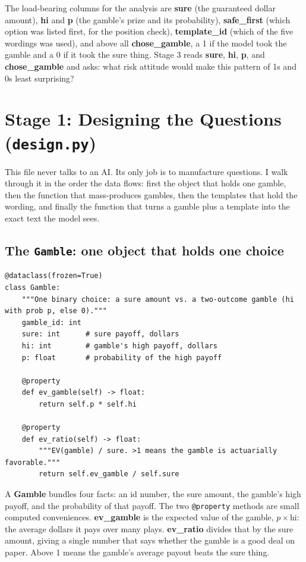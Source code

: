 \documentclass[11pt]{article}
\newcommand{\file}[1]{\textbf{\ttfamily #1}}
\begin{document}
The load-bearing columns for the analysis are \file{sure} (the guaranteed dollar amount), \file{hi}
and \file{p} (the gamble's prize and its probability), \file{safe\_first} (which option was listed
first, for the position check), \file{template\_id} (which of the five wordings was used), and above
all \file{chose\_gamble}, a 1 if the model took the gamble and a 0 if it took the sure thing. Stage 3
reads \file{sure}, \file{hi}, \file{p}, and \file{chose\_gamble} and asks: what risk attitude would
make this pattern of 1s and 0s least surprising?

\section{Stage 1: Designing the Questions (\texttt{design.py})}

This file never talks to an AI. Its only job is to manufacture questions. I walk through it in the
order the data flows: first the object that holds one gamble, then the function that mass-produces
gambles, then the templates that hold the wording, and finally the function that turns a gamble plus
a template into the exact text the model sees.

\subsection{The \texttt{Gamble}: one object that holds one choice}

\begin{lstlisting}[style=py,firstnumber=23]
@dataclass(frozen=True)
class Gamble:
    """One binary choice: a sure amount vs. a two-outcome gamble (hi with prob p, else 0)."""
    gamble_id: int
    sure: int      # sure payoff, dollars
    hi: int        # gamble's high payoff, dollars
    p: float       # probability of the high payoff

    @property
    def ev_gamble(self) -> float:
        return self.p * self.hi

    @property
    def ev_ratio(self) -> float:
        """EV(gamble) / sure. >1 means the gamble is actuarially favorable."""
        return self.ev_gamble / self.sure
\end{lstlisting}

A \file{Gamble} bundles four facts: an id number, the sure amount, the gamble's high payoff, and the
probability of that payoff. The two \verb|@property| methods are small computed conveniences.
\file{ev\_gamble} is the expected value of the gamble, $p \times \text{hi}$: the average dollars it
pays over many plays. \file{ev\_ratio} divides that by the sure amount, giving a single number that
says whether the gamble is a good deal on paper. Above 1 means the gamble's average payout beats the
sure thing.
\end{document}
